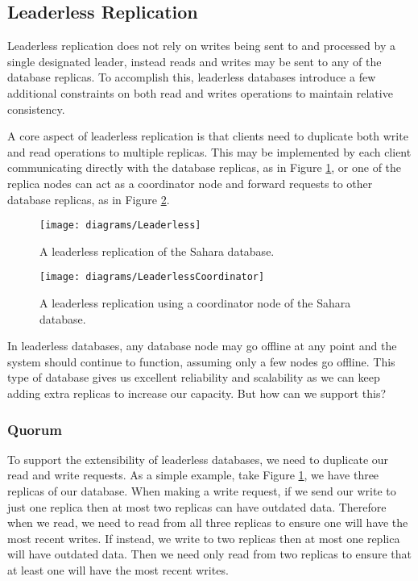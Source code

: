\subsection{Leaderless Replication}

Leaderless replication does not rely on writes being sent to and processed by a single designated leader,
instead reads and writes may be sent to any of the database replicas.
To accomplish this, leaderless databases introduce a few additional constraints on both read and writes operations to maintain relative consistency.

A core aspect of leaderless replication is that clients need to duplicate both write and read operations to multiple replicas.
This may be implemented by each client communicating directly with the database replicas,
as in Figure \ref{fig:sahara-leaderless},
or one of the replica nodes can act as a coordinator node and forward requests to other database replicas,
as in Figure \ref{fig:sahara-leaderless-coordinator}.

\begin{figure}[ht]
    \begin{center}
    \texttt{[image: diagrams/Leaderless]}
    \end{center}
    \caption{A leaderless replication of the Sahara database.}
    \label{fig:sahara-leaderless}
\end{figure}

\begin{figure}[ht]
    \begin{center}
    \texttt{[image: diagrams/LeaderlessCoordinator]}
    \end{center}
    \caption{A leaderless replication using a coordinator node of the Sahara database.}
    \label{fig:sahara-leaderless-coordinator}
\end{figure}

In leaderless databases,
any database node may go offline at any point and the system should continue to function, assuming only a few nodes go offline.
This type of database gives us excellent reliability and scalability as we can keep adding extra replicas to increase our capacity.
But how can we support this?

\subsubsection*{Quorum}

To support the extensibility of leaderless databases,
we need to duplicate our read and write requests.
As a simple example,
take Figure \ref{fig:sahara-leaderless},
we have three replicas of our database.
When making a write request,
if we send our write to just one replica then at most two replicas can have outdated data.
Therefore when we read, we need to read from all three replicas to ensure one will have the most recent writes.
If instead,
we write to two replicas then at most one replica will have outdated data.
Then we need only read from two replicas to ensure that at least one will have the most recent writes.

